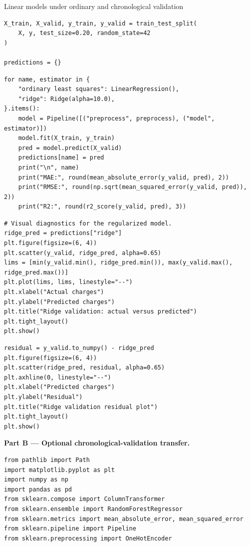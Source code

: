 \begin{labproject}{Linear models under ordinary and chronological validation}
\begin{lstlisting}[style=mlpython]
X_train, X_valid, y_train, y_valid = train_test_split(
    X, y, test_size=0.20, random_state=42
)

predictions = {}
\end{lstlisting}

\begin{lstlisting}[style=mlpython]
for name, estimator in {
    "ordinary least squares": LinearRegression(),
    "ridge": Ridge(alpha=10.0),
}.items():
    model = Pipeline([("preprocess", preprocess), ("model", estimator)])
    model.fit(X_train, y_train)
    pred = model.predict(X_valid)
    predictions[name] = pred
    print("\n", name)
    print("MAE:", round(mean_absolute_error(y_valid, pred), 2))
    print("RMSE:", round(np.sqrt(mean_squared_error(y_valid, pred)), 2))
    print("R2:", round(r2_score(y_valid, pred), 3))
\end{lstlisting}

\begin{lstlisting}[style=mlpython]
# Visual diagnostics for the regularized model.
ridge_pred = predictions["ridge"]
plt.figure(figsize=(6, 4))
plt.scatter(y_valid, ridge_pred, alpha=0.65)
lims = [min(y_valid.min(), ridge_pred.min()), max(y_valid.max(), ridge_pred.max())]
plt.plot(lims, lims, linestyle="--")
plt.xlabel("Actual charges")
plt.ylabel("Predicted charges")
plt.title("Ridge validation: actual versus predicted")
plt.tight_layout()
plt.show()
\end{lstlisting}

\begin{lstlisting}[style=mlpython]
residual = y_valid.to_numpy() - ridge_pred
plt.figure(figsize=(6, 4))
plt.scatter(ridge_pred, residual, alpha=0.65)
plt.axhline(0, linestyle="--")
plt.xlabel("Predicted charges")
plt.ylabel("Residual")
plt.title("Ridge validation residual plot")
plt.tight_layout()
plt.show()
\end{lstlisting}

\medskip\noindent\textbf{Part B --- Optional chronological-validation transfer.}\par
\begin{lstlisting}[style=mlpython]
from pathlib import Path
import matplotlib.pyplot as plt
import numpy as np
import pandas as pd
from sklearn.compose import ColumnTransformer
from sklearn.ensemble import RandomForestRegressor
from sklearn.metrics import mean_absolute_error, mean_squared_error
from sklearn.pipeline import Pipeline
from sklearn.preprocessing import OneHotEncoder
\end{lstlisting}


\end{labproject}

